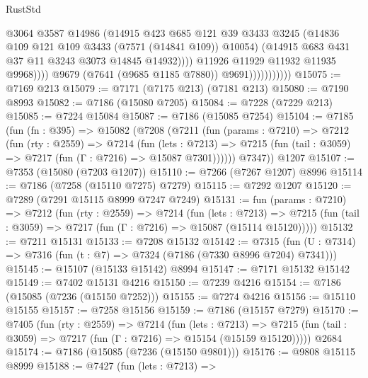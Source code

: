 \begin{lexlean}{RustStd}
\begin{coremodule}
{\begin{coremodule}
{{{{{{{{{{{{{{{{{{{{{{{{{{{{{{{{                                      @3064
                                      @3587
                                      @14986
                                      (@14915
                                        @423
                                        @685
                                        @121
                                        @39
                                        @3433
                                        @3245
                                        (@14836 @109 @121 @109 @3433 (@7571 (@14841 @109)) @10054)
                                        (@14915 @683 @431 @37 @11 @3243 @3073 @14845 @14932))))
                                  @11926
                                  @11929
                                  @11932
                                  @11935
                                  @9968))))
                          @9679
                          (@7641 (@9685 @1185 @7880))
                          @9691)))))))))))
@15075 := @7169 @213
@15079 := @7171 (@7175 @213) (@7181 @213)
@15080 := @7190 @8993
@15082 := @7186 (@15080 @7205)
@15084 := @7228 (@7229 @213)
@15085 := @7224 @15084
@15087 := @7186 (@15085 @7254)
@15104 := @7185
    (fun (fn : @395) =>
    @15082
      (@7208
        (@7211
          (fun (params : @7210) =>
          @7212
            (fun (rty : @2559) =>
            @7214
              (fun (lets : @7213) =>
              @7215 (fun (tail : @3059) => @7217 (fun (Γ : @7216) => @15087 @7301))))))
        @7347))
    @1207
@15107 := @7353 (@15080 (@7203 @1207))
@15110 := @7266 (@7267 @1207) @8996
@15114 := @7186 (@7258 (@15110 @7275) @7279)
@15115 := @7292 @1207
@15120 := @7289 (@7291 @15115 @8999 @7247 @7249)
@15131 := fun (params : @7210) =>
  @7212
    (fun (rty : @2559) =>
    @7214
      (fun (lets : @7213) =>
      @7215 (fun (tail : @3059) => @7217 (fun (Γ : @7216) => @15087 (@15114 @15120)))))
@15132 := @7211 @15131
@15133 := @7208 @15132
@15142 := @7315 (fun (U : @7314) => @7316 (fun (t : @7) => @7324 (@7186 (@7330 @8996 @7204) @7341)))
@15145 := @15107 (@15133 @15142) @8994
@15147 := @7171 @15132 @15142
@15149 := @7402 @15131 @4216
@15150 := @7239 @4216
@15154 := @7186 (@15085 (@7236 (@15150 @7252)))
@15155 := @7274 @4216
@15156 := @15110 @15155
@15157 := @7258 @15156
@15159 := @7186 (@15157 @7279)
@15170 := @7405
    (fun (rty : @2559) =>
    @7214
      (fun (lets : @7213) =>
      @7215 (fun (tail : @3059) => @7217 (fun (Γ : @7216) => @15154 (@15159 @15120)))))
    @2684
@15174 := @7186 (@15085 (@7236 (@15150 @9801)))
@15176 := @9808 @15115 @8999
@15188 := @7427
    (fun (lets : @7213) =>
}}}}}}}}}}}}}}}}}}}}}}}}}}}}}}}}
\end{coremodule}}
\end{coremodule}
\end{lexlean}
